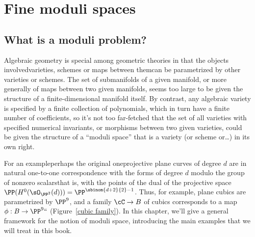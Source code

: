 

\chapter{Fine moduli spaces}
\label{Moduli chapter}
\label{ModuliChapter}

\section{What is a moduli problem?}

Algebraic geometry is special among geometric theories in
that
the objects involved\emdash varieties,  schemes or maps between
them\emdash can be parametrized by other varieties or schemes. The set
of submanifolds of a given manifold, or more generally of maps between
two given manifolds, seems too large to be given the structure of a
finite-dimensional manifold itself. By contrast, any algebraic variety
is specified by a finite collection of polynomials, which in turn have
a finite number of coefficients, so it's not too far-fetched that the
set of all varieties with specified numerical invariants, or
morphisms between two given varieties, could be given the structure of
a ``moduli space'' that is a variety (or scheme or\dots) in its own
right.

For an example\emdash perhaps the original one\emdash projective plane
curves of degree $d$
are in natural one-to-one correspondence with the forms of degree $d$
modulo the group of nonzero scalars\emdash that is, with the points of
the dual of the projective space
$ \PP(H^0(\sO_{\PP^2}(d)))=\PP^{\sbinom{d+2}{2}-1} $.
Thus, for example, plane cubics are parametrized by $\PP^{9}$, and a
family $\cC \to B$ of cubics corresponds to a map $\phi: B \to \PP^9` `$ (Figure~\ref{cubic family}).
In this chapter, we'll give a general framework for the notion of moduli
space, introducing the main examples that we will treat in this book.

